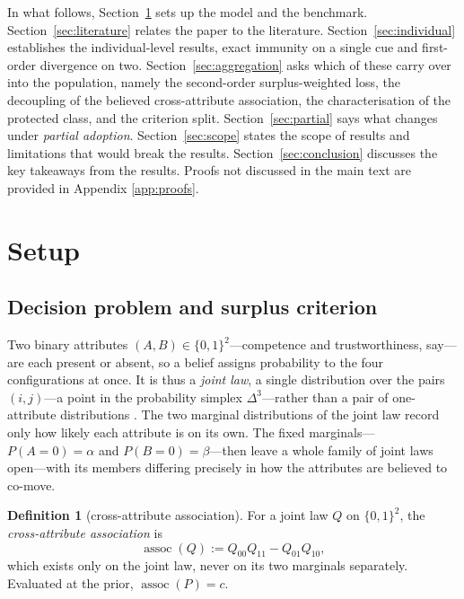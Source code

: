 \documentclass[a4paper,fleqn]{cas-sc}
\theoremstyle{remark}
\theoremstyle{definition}
\newtheorem{definition}{Definition}
\newcommand{\assoc}{\operatorname{assoc}}
\newcommand{\anchor}[1]{}
\begin{document}
In what follows, Section~\ref{sec:setup} sets up the model and the benchmark.
Section~\ref{sec:literature} relates the paper to the literature.
Section~\ref{sec:individual} establishes the individual-level results, exact immunity on a single cue and first-order divergence on two. Section~\ref{sec:aggregation} asks which of these carry over into the population, namely the
second-order surplus-weighted loss, the decoupling of the believed cross-attribute association, the
characterisation of the protected class, and the criterion split.
Section~\ref{sec:partial} says what changes under \emph{partial adoption}. Section~\ref{sec:scope} states the scope of results and limitations that would break the results. Section~\ref{sec:conclusion} discusses the key takeaways from the results. Proofs not discussed in the main text are provided in Appendix \ref{app:proofs}.

\section{Setup}
\label{sec:setup}

\subsection{Decision problem and surplus criterion}
\label{sec:decision}

Two binary attributes $(A,B)\in\{0,1\}^{2}$---competence and trustworthiness, say---are each present or absent, so a belief assigns probability to the four configurations at once. It is thus a \emph{joint law}, a single distribution over the pairs $(i,j)$---a point in the probability simplex $\Delta^{3}$---rather than a pair of one-attribute distributions \anchor{Setup}. The two marginal distributions of the joint law record only how likely each attribute is on its own. The fixed marginals---$P(A{=}0)=\alpha$ and $P(B{=}0)=\beta$---then leave a whole family of joint laws
open---with its members differing precisely in how the attributes are believed to co-move. 

\begin{definition}[cross-attribute association]\label{def:assoc}
For a joint law $Q$ on $\{0,1\}^2$, the \emph{cross-attribute association} is
\[
  \assoc(Q):=Q_{00}Q_{11}-Q_{01}Q_{10},
\]
which exists only on the joint law, never on its two marginals separately. Evaluated at the prior, $\assoc(P)=c$.
\end{definition}
\end{document}
